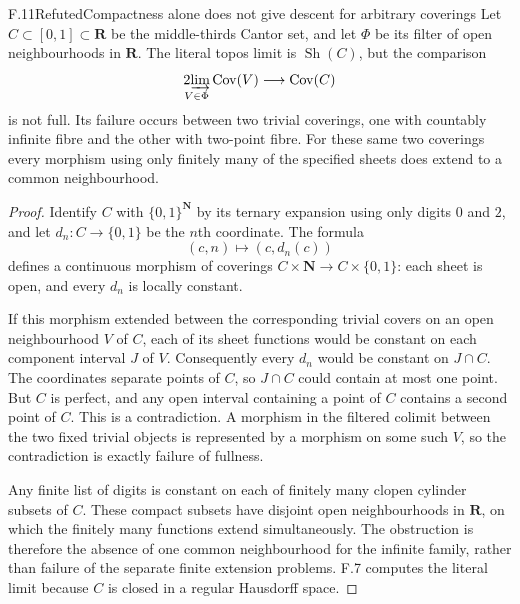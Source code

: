 \begin{statement}{F.11}{Refuted}{Compactness alone does not give descent for arbitrary coverings}
Let $C\subset[0,1]\subset\mathbf R$ be the middle-thirds Cantor
set, and let $\Phi$ be its filter of open neighbourhoods in
$\mathbf R$. The literal topos limit is $\operatorname{Sh}(C)$,
but the comparison
\[
 \operatorname*{2\!\varinjlim}_{V\in\Phi}\operatorname{Cov}(V)
          \longrightarrow\operatorname{Cov}(C)
\]
is not full. Its failure occurs between two trivial coverings, one
with countably infinite fibre and the other with two-point fibre.
For these same two coverings every morphism using only finitely many
of the specified sheets does extend to a common neighbourhood.
\end{statement}
\begin{proof}
Identify $C$ with $\{0,1\}^{\mathbf N}$ by its ternary expansion
using only digits $0$ and $2$, and let $d_n:C\to\{0,1\}$ be
the $n$th coordinate. The formula
\[
  (c,n)\longmapsto(c,d_n(c))
\]
defines a continuous morphism of coverings
$C\times\mathbf N\to C\times\{0,1\}$: each sheet is open,
and every $d_n$ is locally constant.

If this morphism extended between the corresponding trivial covers
on an open neighbourhood $V$ of $C$, each of its sheet functions
would be constant on each component interval $J$ of $V$.
Consequently every $d_n$ would be constant on $J\cap C$.
The coordinates separate points of $C$, so $J\cap C$ could contain
at most one point. But $C$ is perfect, and any open interval
containing a point of $C$ contains a second point of $C$. This is a
contradiction. A morphism in the filtered colimit between the two
fixed trivial objects is represented by a morphism on some such $V$,
so the contradiction is exactly failure of fullness.

Any finite list of digits is constant on each of finitely many
clopen cylinder subsets of $C$. These compact subsets have disjoint
open neighbourhoods in $\mathbf R$, on which the finitely many
functions extend simultaneously. The obstruction is therefore the
absence of one common neighbourhood for the infinite family, rather
than failure of the separate finite extension problems. F.7 computes
the literal limit because $C$ is closed in a regular Hausdorff space.
\end{proof}

